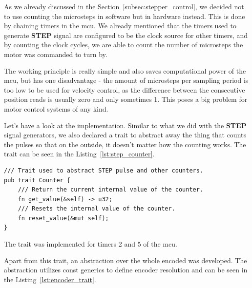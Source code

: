 As we already discussed in the Section~\ref{subsec:stepper_control}, we decided not to use counting the microsteps in software but in hardware instead.
This is done by chaining timers in the \acs{mcu}.
We already mentioned that the timers used to generate \textbf{STEP} signal are configured to be the clock source for other timers, and by counting the clock cycles, we are able to count the number of microsteps the motor was commanded to turn by.

The working principle is really simple and also saves computational power of the \acs{mcu}, but has one disadvantage - the amount of microsteps per sampling period is too low to be used for velocity control, as the difference between the consecutive position reads is usually zero and only sometimes 1.
This poses a big problem for motor control systems of any kind.

Let's have a look at the implementation.
Similar to what we did with the \textbf{STEP} signal generators, we also declared a trait to abstract away the thing that counts the pulses so that on the outside, it doesn't matter how the counting works.
The trait can be seen in the Listing~\ref{lst:step_counter}.

\begin{lstlisting}[caption={Counter trait for counting STEP pulses.},label=lst:step_counter]
/// Trait used to abstract STEP pulse and other counters.
pub trait Counter {
    /// Return the current internal value of the counter.
    fn get_value(&self) -> u32;
    /// Resets the internal value of the counter.
    fn reset_value(&mut self);
}
\end{lstlisting}
The trait was implemented for timers 2 and 5 of the \acs{mcu}.

Apart from this trait, an abstraction over the whole encoded was developed.
The abstraction utilizes const generics to define encoder resolution and can be seen in the Listing~\ref{lst:encoder_trait}.

